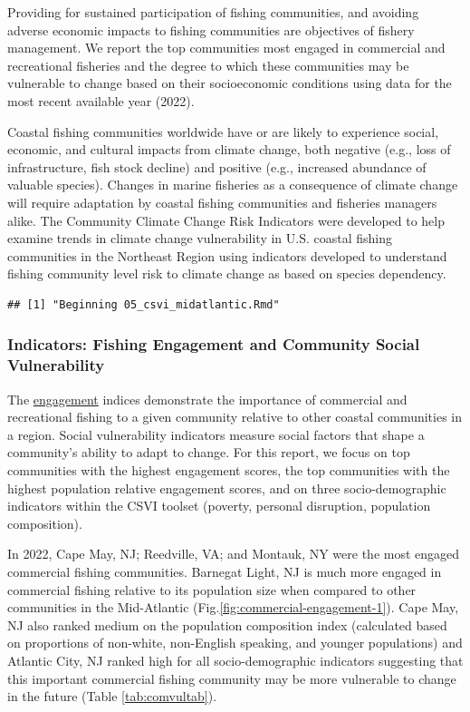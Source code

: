 \documentclass[
  10pt,
]{article}
\begin{document}
Providing for sustained participation of fishing communities, and avoiding adverse economic impacts to fishing communities are objectives of fishery management. We report the top communities most engaged in commercial and recreational fisheries and the degree to which these communities may be vulnerable to change based on their socioeconomic conditions using data for the most recent available year (2022).

Coastal fishing communities worldwide have or are likely to experience social, economic, and cultural impacts from climate change, both negative (e.g., loss of infrastructure, fish stock decline) and positive (e.g., increased abundance of valuable species). Changes in marine fisheries as a consequence of climate change will require adaptation by coastal fishing communities and fisheries managers alike. The Community Climate Change Risk Indicators were developed to help examine trends in climate change vulnerability in U.S. coastal fishing communities in the Northeast Region using indicators developed to understand fishing community level risk to climate change as based on species dependency.

\begin{verbatim}
## [1] "Beginning 05_csvi_midatlantic.Rmd"
\end{verbatim}

\subsubsection{Indicators: Fishing Engagement and Community Social Vulnerability}\label{indicators-fishing-engagement-and-community-social-vulnerability}

The \href{https://noaa-edab.github.io/catalog/engagement.html}{engagement} indices demonstrate the importance of commercial and recreational fishing to a given community relative to other coastal communities in a region. Social vulnerability indicators measure social factors that shape a community's ability to adapt to change. For this report, we focus on top communities with the highest engagement scores, the top communities with the highest population relative engagement scores, and on three socio-demographic indicators within the CSVI toolset (poverty, personal disruption, population composition).

In 2022, Cape May, NJ; Reedville, VA; and Montauk, NY were the most engaged commercial fishing communities. Barnegat Light, NJ is much more engaged in commercial fishing relative to its population size when compared to other communities in the Mid-Atlantic (Fig.\ref{fig:commercial-engagement-1}). Cape May, NJ also ranked medium on the population composition index (calculated based on proportions of non-white, non-English speaking, and younger populations) and Atlantic City, NJ ranked high for all socio-demographic indicators suggesting that this important commercial fishing community may be more vulnerable to change in the future (Table \ref{tab:comvultab}).
\end{document}
